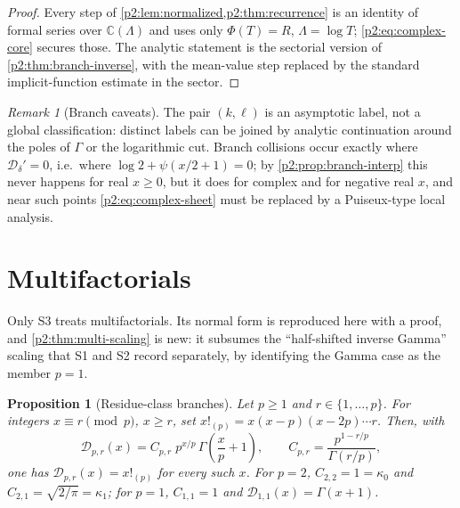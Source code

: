 \documentclass[11pt,a4paper,oneside]{book}
\theoremstyle{plain}
\newtheorem{proposition}[theorem]{Proposition}
\theoremstyle{definition}
\theoremstyle{remark}
\newtheorem{remark}[theorem]{Remark}
\newcommand{\Cplx}{\mathbb{C}}
\begin{document}
\begin{proof}
Every step of \cref{p2:lem:normalized,p2:thm:recurrence} is an identity of
formal series over \(\Cplx(\Lambda)\) and uses only \(\Phi(T)=R\),
\(\Lambda=\log T\); \cref{p2:eq:complex-core} secures those.  The analytic
statement is the sectorial version of \cref{p2:thm:branch-inverse}, with the
mean-value step replaced by the standard implicit-function estimate in the
sector.
\end{proof}

\begin{remark}[Branch caveats]
\label{p2:rem:branch-caveat}
The pair \((k,\ell)\) is an asymptotic label, not a global classification:
distinct labels can be joined by analytic continuation around the poles of
\(\Gamma\) or the logarithmic cut.  Branch collisions occur exactly where
\(\mathcal D_\delta'=0\), i.e.\ where \(\log2+\psi(x/2+1)=0\); by
\cref{p2:prop:branch-interp} this never happens for real \(x\ge0\), but it does
for complex and for negative real \(x\), and near such points
\cref{p2:eq:complex-sheet} must be replaced by a Puiseux-type local analysis.
\end{remark}

\section{Multifactorials}
\label{p2:sec:multifactorial}

\begin{sourcebox}
Only \textsf{S3} treats multifactorials.  Its normal form is reproduced here
with a proof, and \cref{p2:thm:multi-scaling} is new: it subsumes the
``half-shifted inverse Gamma'' scaling that \textsf{S1} and \textsf{S2} record
separately, by identifying the Gamma case as the member \(p=1\).
\end{sourcebox}

\begin{proposition}[Residue-class branches]
\label{p2:prop:multi-branch}
Let \(p\ge1\) and \(r\in\{1,\dots,p\}\).  For integers \(x\equiv r\pmod p\),
\(x\ge r\), set \(x!_{(p)}=x(x-p)(x-2p)\cdots r\).  Then, with
\begin{equation}
 \mathcal D_{p,r}(x)=C_{p,r}\;p^{x/p}\,\Gamma\!\left(\frac xp+1\right),
 \qquad
 C_{p,r}=\frac{p^{1-r/p}}{\Gamma(r/p)},
 \label{p2:eq:multi-branch}
\end{equation}
one has \(\mathcal D_{p,r}(x)=x!_{(p)}\) for every such \(x\).  For \(p=2\),
\(C_{2,2}=1=\kappa_0\) and \(C_{2,1}=\sqrt{2/\pi}=\kappa_1\); for \(p=1\),
\(C_{1,1}=1\) and \(\mathcal D_{1,1}(x)=\Gamma(x+1)\).
\end{proposition}
\end{document}
